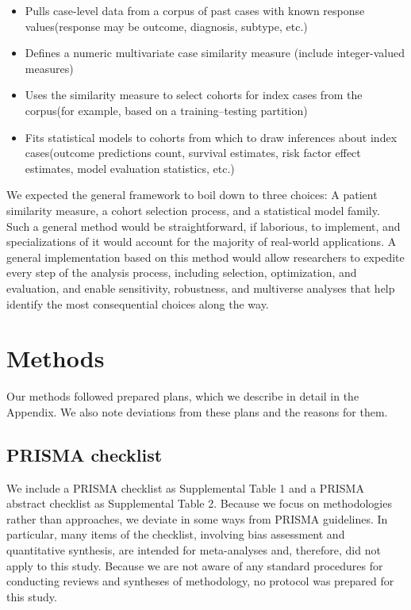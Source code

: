 \documentclass[preprint, 3p,
authoryear]{elsarticle} %
\providecommand{\tightlist}{%
  \setlength{\itemsep}{0pt}\setlength{\parskip}{0pt}}
\begin{document}
\begin{itemize}
\tightlist
\item
  Pulls case-level data from a corpus of past cases with known response
  values\newline (response may be outcome, diagnosis, subtype, etc.)
\item
  Defines a numeric multivariate case similarity measure\newline
  (include integer-valued measures)
\item
  Uses the similarity measure to select cohorts for index cases from the
  corpus\newline (for example, based on a training--testing partition)
\item
  Fits statistical models to cohorts from which to draw inferences about
  index cases\newline (outcome predictions count, survival estimates,
  risk factor effect estimates, model evaluation statistics, etc.)
\end{itemize}

We expected the general framework to boil down to three choices: A
patient similarity measure, a cohort selection process, and a
statistical model family. Such a general method would be
straightforward, if laborious, to implement, and specializations of it
would account for the majority of real-world applications. A general
implementation based on this method would allow researchers to expedite
every step of the analysis process, including selection, optimization,
and evaluation, and enable sensitivity, robustness, and multiverse
analyses that help identify the most consequential choices along the
way.

\hypertarget{methods}{%
\section{Methods}\label{methods}}

Our methods followed prepared plans, which we describe in detail in the
Appendix. We also note deviations from these plans and the reasons for
them.

\hypertarget{prisma-checklist}{%
\subsection{PRISMA checklist}\label{prisma-checklist}}

We include a PRISMA checklist as Supplemental Table 1 and a PRISMA
abstract checklist as Supplemental Table 2. Because we focus on
methodologies rather than approaches, we deviate in some ways from
PRISMA guidelines. In particular, many items of the checklist, involving
bias assessment and quantitative synthesis, are intended for
meta-analyses and, therefore, did not apply to this study. Because we
are not aware of any standard procedures for conducting reviews and
syntheses of methodology, no protocol was prepared for this study.
\end{document}
